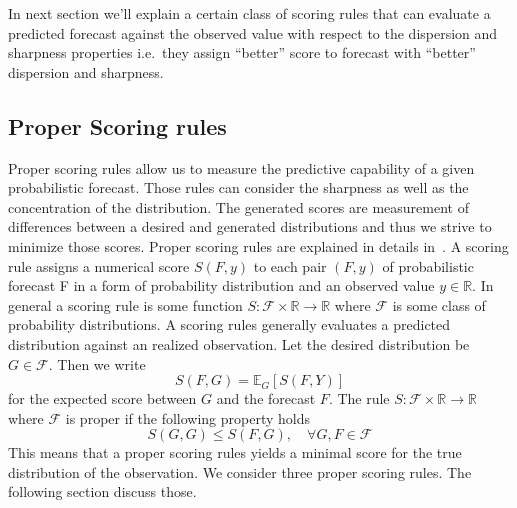 \documentclass[12pt,a4paper,twoside]{scrartcl}
\numberwithin{equation}{section}
\begin{document}
In next section we'll explain a certain class of scoring rules that can evaluate a predicted forecast against the observed value with respect to the dispersion and sharpness properties i.e.\ they assign ``better'' score to forecast with ``better'' dispersion and sharpness.
\subsection{Proper Scoring rules}\label{sec:proper-scoring-rules}
Proper scoring rules allow us to measure the predictive capability of a given probabilistic forecast. Those rules can consider the sharpness as well as the concentration of the distribution. The generated scores are measurement of differences between a desired and generated distributions and thus we strive to minimize those scores. Proper scoring rules are explained in details in~\cite{gneiting2007}.
A scoring rule assigns a numerical score \(S(F, y)\) to each pair \((F, y)\) of probabilistic forecast F in a form of probability distribution and an observed value \(y \in \mathbb{R}\). In general a scoring rule is some function \(S:\mathcal{F} \times \mathbb{R} \rightarrow \mathbb{R}\) where \(\mathcal{F}\) is some class of probability distributions. A scoring rules generally evaluates a predicted distribution against an realized observation. Let the desired distribution be \(G\in\mathcal{F}\). Then we write
\begin{equation}
  S(F,G) =\mathbb{E}_G[S(F,Y)]
\end{equation}
for the expected score between \(G\) and the forecast \(F\). 
The rule \(S: \mathcal{F} \times \mathbb{R} \rightarrow \mathbb{R}\) where \(\mathcal{F}\) is proper if the following property holds
\begin{equation}
  S(G,G) \leq S(F,G),\quad \forall G,F \in \mathcal{F}
\end{equation}
This means that a proper scoring rules yields a minimal score for the true distribution of the observation.
We consider three proper scoring rules. The following section discuss those.
\end{document}
